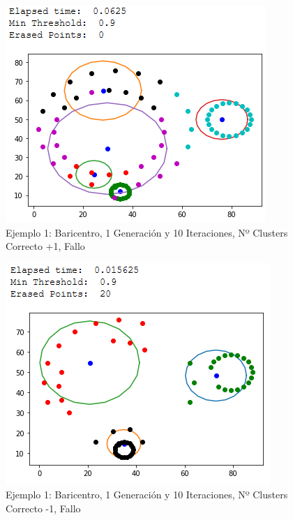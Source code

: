 \documentclass[conference,a4paper]{IEEEtran}
\begin{document}
\begin{figure}[H]
\centering
\includegraphics[scale=0.65]{Experimentacion/Ejemplo1/ej1_b_1_10_mc}
\caption{Ejemplo 1: Baricentro, 1 Generación y 10 Iteraciones,  Nº Clusters Correcto +1, Fallo\\}
\end{figure}

\begin{figure}[H]
\centering
\includegraphics[scale=0.65]{Experimentacion/Ejemplo1/ej1_b_1_10_lc}
\caption{Ejemplo 1: Baricentro, 1 Generación y 10 Iteraciones,  Nº Clusters Correcto -1, Fallo\\}
\end{figure}
\end{document}
